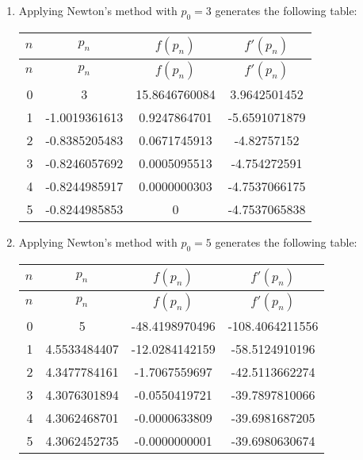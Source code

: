 \documentclass[../../../../Assignments]{subfiles}
\begin{document}
\begin{solution}
\begin{enumerate}[label = \alph*)]
        \item Applying Newton's method with \(p_0 = 3\) generates the following
            table:

            \begin{longtable}{r S[table-format=-1.10] S[table-format=2.10] S[table-format=-1.10]}
                \toprule
                \(n\)  &    {\(p_n\)}    &   {\(f(p_n)\)}  &  {\(f'(p_n)\)}  \\
                \midrule
                \endfirsthead
                \(n\)  &    {\(p_n\)}    &   {\(f(p_n)\)}  &  {\(f'(p_n)\)}  \\
                \midrule
                  &   3             &  15.8646760084  &   3.9642501452  \\
                    1  &  -1.0019361613  &   0.9247864701  &  -5.6591071879  \\
                    2  &  -0.8385205483  &   0.0671745913  &  -4.82757152    \\
                    3  &  -0.8246057692  &   0.0005095513  &  -4.754272591   \\
                    4  &  -0.8244985917  &   0.0000000303  &  -4.7537066175  \\
                    5  &  -0.8244985853  &   0             &  -4.7537065838  \\
                \bottomrule
            \end{longtable}

        \item Applying Newton's method with \(p_0 = 5\) generates the following
            table:

            \begin{longtable}{r S[table-format=1.10] S[table-format=-2.10] S[table-format=-3.10]}
                \toprule
                \(n\)  &    {\(p_n\)}   &   {\(f(p_n)\)}   &   {\(f'(p_n)\)}   \\
                \midrule
                \endfirsthead
                \(n\)  &    {\(p_n\)}   &   {\(f(p_n)\)}   &   {\(f'(p_n)\)}   \\
                \midrule
                  &  5             &  -48.4198970496  &  -108.4064211556  \\
                    1  &  4.5533484407  &  -12.0284142159  &   -58.5124910196  \\
                    2  &  4.3477784161  &   -1.7067559697  &   -42.5113662274  \\
                    3  &  4.3076301894  &   -0.0550419721  &   -39.7897810066  \\
                    4  &  4.3062468701  &   -0.0000633809  &   -39.6981687205  \\
                    5  &  4.3062452735  &   -0.0000000001  &   -39.6980630674  \\
                \bottomrule
            \end{longtable}


\end{enumerate}
\end{solution}
\end{document}
